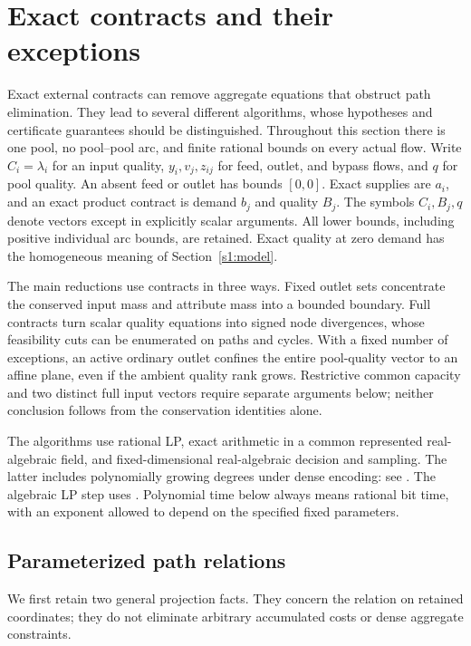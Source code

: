 \section{Exact contracts and their exceptions}\label{s5:contracts}

Exact external contracts can remove aggregate equations that obstruct
path elimination. They lead to several different algorithms, whose
hypotheses and certificate guarantees should be distinguished. Throughout
this section there is one pool, no pool--pool arc, and finite rational
bounds on every actual flow. Write $C_i=\lambda_i$ for an input quality,
$y_i,v_j,z_{ij}$ for feed, outlet, and bypass flows, and $q$ for pool
quality. An absent feed or outlet has bounds $[0,0]$. Exact supplies are
$a_i$, and an exact product contract is demand $b_j$ and quality $B_j$.
The symbols $C_i,B_j,q$ denote vectors except in explicitly scalar
arguments. All lower bounds, including positive individual arc bounds,
are retained. Exact quality at zero demand has the homogeneous meaning
of Section~\ref{s1:model}.

The main reductions use contracts in three ways. Fixed outlet sets
concentrate the conserved input mass and attribute mass into a bounded
boundary. Full contracts turn scalar quality equations into signed
node divergences, whose feasibility cuts can be enumerated on paths
and cycles. With a fixed number of exceptions, an active ordinary
outlet confines the entire pool-quality vector to an affine plane,
even if the ambient quality rank grows. Restrictive common capacity
and two distinct full input vectors require separate arguments below;
neither conclusion follows from the conservation identities alone.

The algorithms use rational LP, exact arithmetic in a common represented
real-algebraic field, and fixed-dimensional real-algebraic decision and
sampling. The latter includes polynomially growing degrees under dense
encoding: see \citet[Theorem~1.3.1 and Sections~3.1.3--3.2]
{basu1996-on-the-combinatorial-and-algebraic}. The algebraic LP step uses
\citet[Section~5, Remark~1]{s4:adler1994}. Polynomial time below always
means rational bit time, with an exponent allowed to depend on the
specified fixed parameters.

\subsection{Parameterized path relations}\label{s5:parameter-paths}

We first retain two general projection facts. They concern the relation
on retained coordinates; they do not eliminate arbitrary accumulated
costs or dense aggregate constraints.

